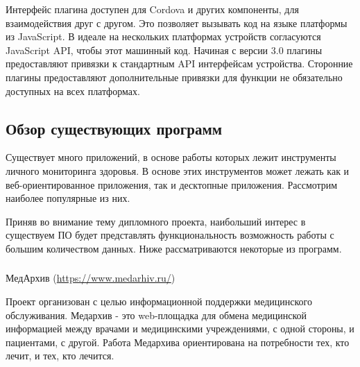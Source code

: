 Интерфейс плагина доступен для Cordova и других компоненты, для взаимодействия друг с другом. Это позволяет вызывать код на языке платформы из JavaScript. В идеале на нескольких платформах устройств согласуются JavaScript API, чтобы этот машинный код. Начиная с версии 3.0 плагины предоставляют привязки к стандартным API интерфейсам устройства. Сторонние плагины предоставляют дополнительные привязки для функции не обязательно доступных на всех платформах.


\subsection{Обзор существующих программ} %
\label{sub:domain:existing_programs}
Существует много приложений, в основе работы которых лежит инструменты личного мониторинга здоровья. В основе этих инструментов может лежать как и веб-ориентированное приложения, так и десктопные приложения. Рассмотрим наиболее популярные из них.

Приняв во внимание тему дипломного проекта, наибольший интерес в существуем ПО будет представлять функциональность возможность работы с большим количеством данных.
Ниже рассматриваются некоторые из программ.

\subsubsection{}МедАрхив (\url{https://www.medarhiv.ru/}) 

Проект организован с целью информационной поддержки медицинского обслуживания. Медархив - это web-площадка для обмена медицинской информацией между врачами и медицинскими учреждениями, с одной стороны, и пациентами, с другой. Работа Медархива ориентирована на потребности тех, кто лечит, и тех, кто лечится.

